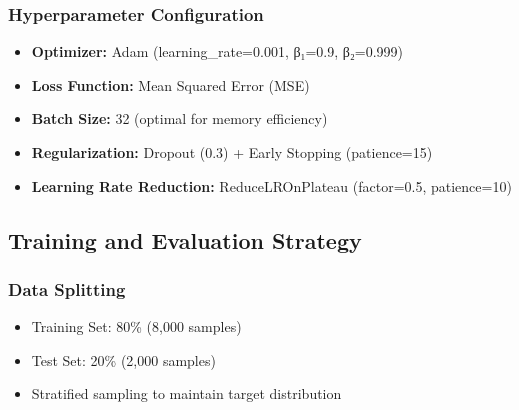 \documentclass[12pt,a4paper]{article}
\begin{document}
\subsubsection{Hyperparameter Configuration}

\begin{itemize}
    \item \textbf{Optimizer:} Adam (learning\_rate=0.001, β₁=0.9, β₂=0.999)
    \item \textbf{Loss Function:} Mean Squared Error (MSE)
    \item \textbf{Batch Size:} 32 (optimal for memory efficiency)
    \item \textbf{Regularization:} Dropout (0.3) + Early Stopping (patience=15)
    \item \textbf{Learning Rate Reduction:} ReduceLROnPlateau (factor=0.5, patience=10)
\end{itemize}

\subsection{Training and Evaluation Strategy}

\subsubsection{Data Splitting}
\begin{itemize}
    \item Training Set: 80\% (8,000 samples)
    \item Test Set: 20\% (2,000 samples)
    \item Stratified sampling to maintain target distribution
\end{itemize}
\end{document}
